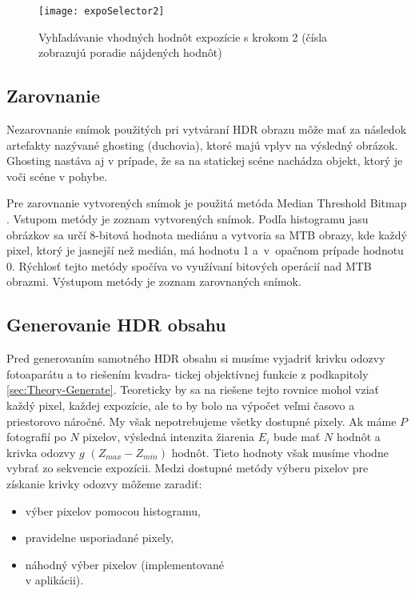 \documentclass[slovak]{ExcelAtFIT}
\begin{document}
\begin{figure}[ht!]
  \centering
  \texttt{[image: expoSelector2]}
  \caption{Vyhľadávanie vhodných hodnôt expozície s krokom 2 (čísla zobrazujú poradie nájdených hodnôt)}
  \label{fig:Exposures}
\end{figure}

\subsection*{Zarovnanie}

Nezarovnanie snímok použitých pri vytváraní HDR obrazu môže mať za následok artefakty nazývané ghosting (duchovia), 
ktoré majú vplyv na výsledný obrázok. Ghosting nastáva aj v prípade, že sa na statickej scéne nachádza objekt, 
ktorý je voči scéne v pohybe.

Pre zarovnanie vytvorených snímok je použitá metóda Median Threshold Bitmap \cite{Align}. Vstupom metódy
je zoznam vytvorených snímok. Podľa histogramu jasu obrázkov sa určí 8-bitová hodnota mediánu a vytvoria sa MTB obrazy,
kde každý pixel, ktorý je jasnejší než medián, má hodnotu 1 a~v~opačnom prípade hodnotu 0. Rýchlosť tejto
metódy spočíva vo využívaní bitových operácií nad MTB obrazmi. Výstupom metódy je zoznam zarovnaných snímok.

\subsection{Generovanie HDR obsahu}
\label{sec:Implement-Generate}

Pred generovaním samotného HDR obsahu si musíme vyjadriť krivku odozvy fotoaparátu a to riešením kvadra- tickej
objektívnej funkcie z podkapitoly \ref{sec:Theory-Generate}. Teoreticky by sa na riešene tejto rovnice mohol vziať
každý pixel, každej expozície, ale to by bolo na výpočet veľmi časovo a priestorovo náročné. My však nepotrebujeme
všetky dostupné pixely. Ak máme $P$ fotografií po $N$ pixelov, výsledná intenzita žiarenia $E_{i}$ bude mať $N$ hodnôt
a krivka odozvy $g$ $(Z_{max} - Z_{min})$\cite{Debevec} hodnôt. Tieto hodnoty však musíme vhodne vybrať zo sekvencie
expozícii.
Medzi dostupné metódy výberu pixelov pre získanie krivky odozvy môžeme zaradiť:
\begin{itemize}
  \item výber pixelov pomocou histogramu,
  \item pravidelne usporiadané pixely,
  \item náhodný výber pixelov (implementované\\v aplikácii).
\end{itemize}
\end{document}
